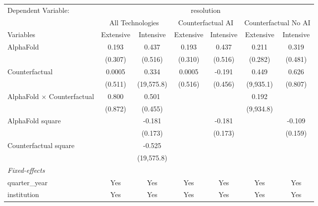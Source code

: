 \begingroup
\centering
\begin{tabular}{lcccccc}
   \tabularnewline \midrule \midrule
   Dependent Variable: & \multicolumn{6}{c}{resolution}\\
 & \multicolumn{2}{c}{All Technologies} & \multicolumn{2}{c}{Counterfactual AI} & \multicolumn{2}{c}{Counterfactual No AI} \\
\cmidrule(lr){1-1}\cmidrule(lr){2-3} \cmidrule(lr){4-5} \cmidrule(lr){6-7}
Variables & \multicolumn{1}{c}{Extensive} & \multicolumn{1}{c}{Intensive} & \multicolumn{1}{c}{Extensive} & \multicolumn{1}{c}{Intensive} & \multicolumn{1}{c}{Extensive} & \multicolumn{1}{c}{Intensive} \\
\cmidrule(lr){1-1}\cmidrule(lr){2-2} \cmidrule(lr){3-3} \cmidrule(lr){4-4} \cmidrule(lr){5-5} \cmidrule(lr){6-6} \cmidrule(lr){7-7}
   AlphaFold                          & 0.193   & 0.437      & 0.193   & 0.437   & 0.211     & 0.319\\   
                                      & (0.307) & (0.516)    & (0.310) & (0.516) & (0.282)   & (0.481)\\   
   Counterfactual                     & 0.0005  & 0.334      & 0.0005  & -0.191  & 0.449     & 0.626\\   
                                      & (0.511) & (19,575.8) & (0.516) & (0.456) & (9,935.1) & (0.807)\\   
   AlphaFold $\times$ Counterfactual  & 0.800   & 0.501      &         &         & 0.192     &   \\   
                                      & (0.872) & (0.455)    &         &         & (9,934.8) &   \\   
   AlphaFold square                   &         & -0.181     &         & -0.181  &           & -0.109\\   
                                      &         & (0.173)    &         & (0.173) &           & (0.159)\\   
   Counterfactual square              &         & -0.525     &         &         &           &   \\   
                                      &         & (19,575.8) &         &         &           &   \\   
   \midrule
   \emph{Fixed-effects}\\
   quarter\_year                      & Yes     & Yes        & Yes     & Yes     & Yes       & Yes\\  
   institution                        & Yes     & Yes        & Yes     & Yes     & Yes       & Yes\\  

\end{tabular}
